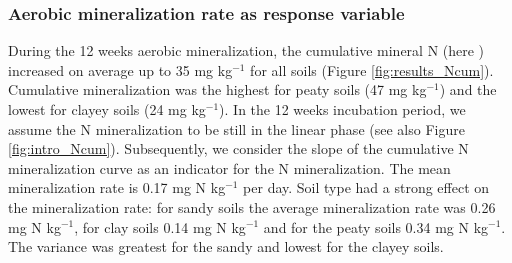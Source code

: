 \documentclass[10pt,twoside,dutch,english]{report}
\begin{document}
 \subsubsection{Aerobic mineralization rate as response variable} 
During the 12 weeks aerobic mineralization, the cumulative mineral N (here ) increased on average up to 35 mg kg$^{-1}$ for all soils (Figure \ref{fig:results_Ncum}). Cumulative mineralization was the highest for peaty soils (47 mg kg$^{-1}$) and the lowest for clayey soils (24 mg kg$^{-1}$).  In the 12 weeks incubation period, we assume the N mineralization to be still in the linear phase (see also Figure \ref{fig:intro_Ncum}). Subsequently, we consider the slope of the cumulative N mineralization curve as an indicator for the N mineralization. The mean mineralization rate  is 0.17 mg N kg$^{-1}$ per day. Soil type had a strong effect on the mineralization rate: for sandy soils the average mineralization rate was 0.26 mg N kg$^{-1}$, for clay soils 0.14 mg N kg$^{-1}$  and for the peaty soils 0.34 mg N kg$^{-1}$. The variance was greatest for the sandy and lowest for the clayey soils. 
\end{document}

